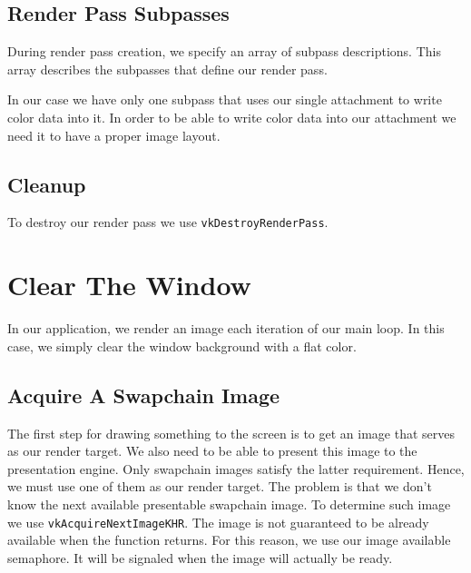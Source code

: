 \begin{minipage}{\linewidth}{\noindent}
    
\end{minipage}

\subsection{Render Pass Subpasses}

During render pass creation, we specify an array of subpass descriptions.
This array describes the subpasses that define our render pass.

In our case we have only one subpass that uses our single attachment to write
color data into it.
In order to be able to write color data into our attachment we need it to have
a proper image layout.

\begin{minipage}{\linewidth}{\noindent}
    
\end{minipage}

\subsection{Cleanup}

To destroy our render pass we use \texttt{vkDestroyRenderPass}.

\section{Clear The Window}

In our application, we render an image each iteration of our main loop.
In this case, we simply clear the window background with a flat color.

\subsection{Acquire A Swapchain Image}

The first step for drawing something to the screen is to get an image that serves
as our render target.
We also need to be able to present this image to the presentation engine.
Only swapchain images satisfy the latter requirement.
Hence, we must use one of them as our render target.
The problem is that we don't know the next available presentable swapchain image.
To determine such image we use \texttt{vkAcquireNextImageKHR}.
The image is not guaranteed to be already available when the function returns.
For this reason, we use our image available semaphore.
It will be signaled when the image will actually be ready.

